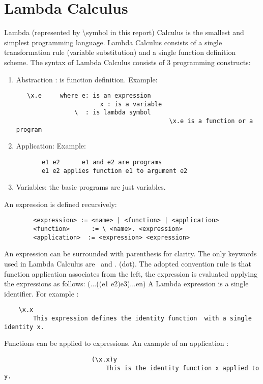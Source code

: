 \documentclass{article}
\begin{document}
\section{Lambda Calculus}
Lambda (represented by \textbackslash   symbol in this report) Calculus is the smallest and simplest programming language. Lambda Calculus consists of a single transformation rule (variable substitution) and a single function definition scheme.
\newline \newline The syntax of Lambda Calculus consists of 3 programming constructs:
\begin{enumerate}
  \item Abstraction : is function definition.
  \newline Example:
   \begin{lstlisting}
   \x.e 	where e: is an expression
			           x : is a variable
				\  : is lambda symbol
                                          \x.e is a function or a program 
\end{lstlisting}
  \item Application: 
  \newline Example:
  \begin{lstlisting}
       e1 e2      e1 and e2 are programs
       e1 e2 applies function e1 to argument e2
\end{lstlisting}
  \item Variables: the basic programs are just variables.
  \end{enumerate}
  An expression is defined recursively: 
  \begin{lstlisting}
        <expression> := <name> | <function> | <application>
        <function>      := \ <name>. <expression>
        <application>  := <expression> <expression>
\end{lstlisting}
 An expression can be surrounded with parenthesis for clarity.
\newline The only keywords used in Lambda Calculus are \ and . (dot).
\newline The adopted convention rule is that function application associates from the left, the expression is evaluated applying the expressions as follows:
\newline \newline \indent (...((e1 e2)e3)...en)
\newline \newline A Lambda expression is a single identifier. 
\newline	For example : 
\begin{lstlisting}
    \x.x 
        This expression defines the identity function  with a single identity x.
\end{lstlisting}   
 Functions can be applied to expressions. 
\newline An example of  an application :
\begin{lstlisting}
                        (\x.x)y
                            This is the identity function x applied to y.
\end{lstlisting} 
\end{document}
